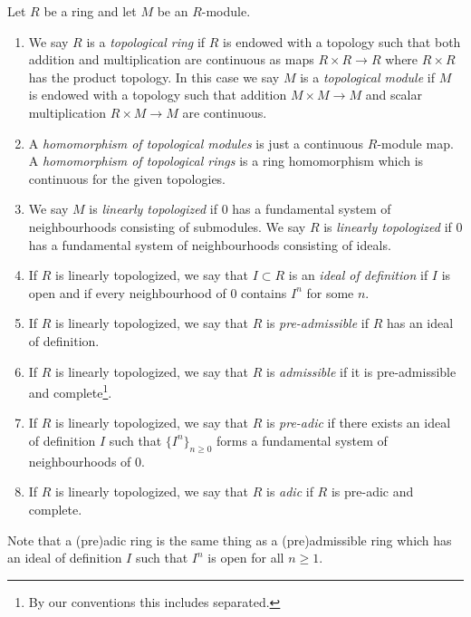 \begin{definition}
\label{definition-topological-ring}
Let $R$ be a ring and let $M$ be an $R$-module.
\begin{enumerate}
\item We say $R$ is a {\it topological ring} if $R$ is endowed with a topology
such that both addition and multiplication are continuous as maps
$R \times R \to R$ where $R \times R$ has the product topology.
In this case we say $M$ is a {\it topological module} if $M$ is endowed
with a topology such that addition $M \times M \to M$ and
scalar multiplication $R \times M \to M$ are continuous.
\item A {\it homomorphism of topological modules} is just a continuous
$R$-module map. A {\it homomorphism of topological rings} is a
ring homomorphism which is continuous for the given topologies.
\item We say $M$ is {\it linearly topologized} if $0$ has a fundamental
system of neighbourhoods consisting of submodules. We say $R$ is
{\it linearly topologized} if $0$ has a fundamental system of neighbourhoods
consisting of ideals.
\item If $R$ is linearly topologized, we say that $I \subset R$ is an
{\it ideal of definition} if $I$ is open and if every neighbourhood
of $0$ contains $I^n$ for some $n$.
\item If $R$ is linearly topologized, we say that $R$ is {\it pre-admissible}
if $R$ has an ideal of definition.
\item If $R$ is linearly topologized, we say that $R$ is {\it admissible} if
it is pre-admissible and
complete\footnote{By our conventions this includes separated.}.
\item If $R$ is linearly topologized, we say that $R$ is {\it pre-adic} if
there exists an ideal of definition $I$ such that $\{I^n\}_{n \geq 0}$
forms a fundamental system of neighbourhoods of $0$.
\item If $R$ is linearly topologized, we say that $R$ is {\it adic} if
$R$ is pre-adic and complete.
\end{enumerate}
Note that a (pre)adic ring is the same thing as a (pre)admissible
ring which has an ideal of definition $I$ such that $I^n$ is
open for all $n \geq 1$.
\end{definition}

